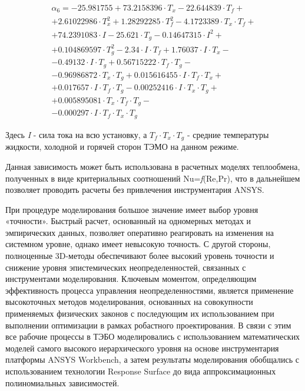 \[
	\begin{array}{l}
		\alpha _{6} =-25.981755+73.2158396\cdot T_{x} -22.644839\cdot T_{f}+
		\\+
		2.61022986\cdot T_{x}^{2} + 1.28292285\cdot T_{f}^{2} -4.1723389\cdot T_{x} \cdot T_{f} +
		\\+
		74.2391083\cdot I-25.621\cdot T_{g} -0.14647315\cdot I^{2} +
		\\+
		0.104869597\cdot T_{g}^{2} -2.34\cdot I\cdot T_{f} +
		1.76037\cdot I\cdot T_{x} -
		\\-
		0.49132\cdot I\cdot T_{g} +
		0.56715222\cdot T_{f} \cdot T_{g} -
		\\-
		0.96986872\cdot T_{x} \cdot T_{g} +
		0.015616455\cdot I\cdot T_{f} \cdot T_{x} +
		\\+
		0.017657\cdot I\cdot T_{f} \cdot T_{g} -
		0.00252416\cdot I\cdot T_{x} \cdot T_{g} +
		\\+
		0.005895081\cdot T_{x} \cdot T_{f} \cdot T_{g} -
		\\-
		0.000297\cdot I\cdot T_{f} \cdot T_{x} \cdot T_{g}
	\end{array}
\]

Здесь \textit{I} - сила тока на всю установку, а $T_{f} \cdot T_{x} \cdot T_{g} $ - средние температуры жидкости, холодной и горячей сторон ТЭМО на данном режиме.

Данная зависимость может быть использована в расчетных моделях теплообмена,
полученных в виде критериальных соотношений Nu=\textit{f}(Re,Pr),
что в дальнейшем позволяет проводить расчеты без привлечения инструментария ANSYS.

При процедуре моделирования большое значение имеет выбор уровня «точности». Быстрый расчет, основанный на одномерных методах и эмпирических данных, позволяет оперативно реагировать на изменения на системном уровне, однако имеет невысокую точность. С другой стороны, полноценные 3D-методы обеспечивают более высокий уровень точности и снижение уровня эпистемических неопределенностей, связанных с инструментами моделирования. Ключевым моментом, определяющим эффективность процесса управления неопределенностями, является применение высокоточных методов моделирования, основанных на совокупности применяемых физических законов с последующим их использованием при выполнении оптимизации в рамках робастного проектирования. В связи с этим все рабочие процессы в ТЭБО моделировались с использованием математических моделей самого высокого иерархического уровня на основе инструментария платформы ANSYS Workbench, а затем результаты моделирования обобщались с использованием технологии Response Surface до вида аппроксимационных полиномиальных зависимостей.

